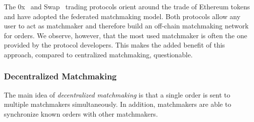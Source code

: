 


The 0x~\cite{warren20170x} and Swap~\cite{airswap} trading protocols orient around the trade of Ethereum tokens and have adopted the federated matchmaking model.
Both protocols allow any user to act as matchmaker and therefore build an off-chain matchmaking network for orders.
We observe, however, that the most used matchmaker is often the one provided by the protocol developers.
This makes the added benefit of this approach, compared to centralized matchmaking, questionable.

\subsubsection{Decentralized Matchmaking}
The main idea of \emph{decentralized matchmaking} is that a single order is sent to multiple matchmakers simultaneously.
In addition, matchmakers are able to synchronize known orders with other matchmakers.

